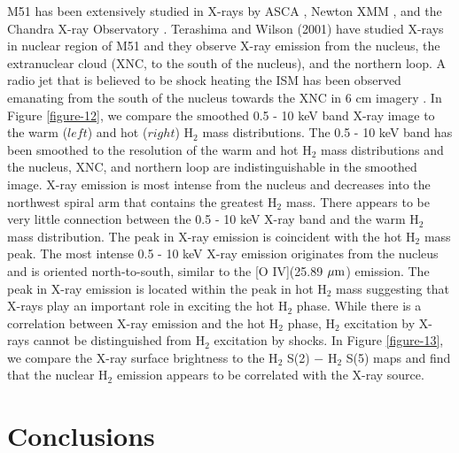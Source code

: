 \documentclass[manuscript]{aastex}
\begin{document}
M51 has been extensively studied in X-rays by ASCA \citep{ter98},
Newton XMM \citep{dew05}, and the Chandra X-ray Observatory
\citep{wil01}.  Terashima and Wilson (2001) have studied X-rays 
in nuclear region of M51 and they observe X-ray emission from 
the nucleus, the extranuclear cloud (XNC, to the south of the nucleus), 
and the northern loop.  A radio jet that is believed to be shock heating 
the ISM has been observed emanating from the south of the nucleus 
towards the XNC in 6 cm imagery \citep{cra92}.  In Figure \ref{figure-12}, 
we compare the smoothed 0.5 - 10 keV band X-ray
image to the warm ($left$) and hot ($right$) $\mathrm{H_2}$ mass
distributions.  The 0.5 - 10 keV band has been smoothed to the
resolution of the warm and hot $\mathrm{H_2}$ mass distributions and
the nucleus, XNC, and northern loop are indistinguishable in the
smoothed image.  X-ray emission is most intense from the nucleus and
decreases into the northwest spiral arm that contains the greatest
$\mathrm{H_2}$ mass.  There appears to be very little connection
between the 0.5 - 10 keV X-ray band and the warm $\mathrm{H_2}$ mass
distribution.  The peak in X-ray emission is coincident with the hot $\mathrm{H_2}$
mass peak. The most intense 0.5 - 10 keV X-ray emission originates
from the nucleus and is oriented north-to-south, similar to the [O
  IV](25.89 $\mbox{$\mu$m}$) emission.  The peak in X-ray emission is
located within the peak in hot $\mathrm{H_2}$ mass suggesting that
X-rays play an important role in exciting the hot $\mathrm{H_2}$
phase.  While there is a correlation between X-ray emission and the
hot $\mathrm{H_2}$ phase, $\mathrm{H_2}$ excitation by X-rays cannot
be distinguished from $\mathrm{H_2}$ excitation by shocks. In Figure 
\ref{figure-13}, we compare the X-ray surface brightness to the H$_2$ S(2) $-$ 
H$_2$ S(5) maps and find that the nuclear $\mathrm{H_2}$ emission 
appears to be correlated with the X-ray source.

\section{Conclusions}
\end{document}
